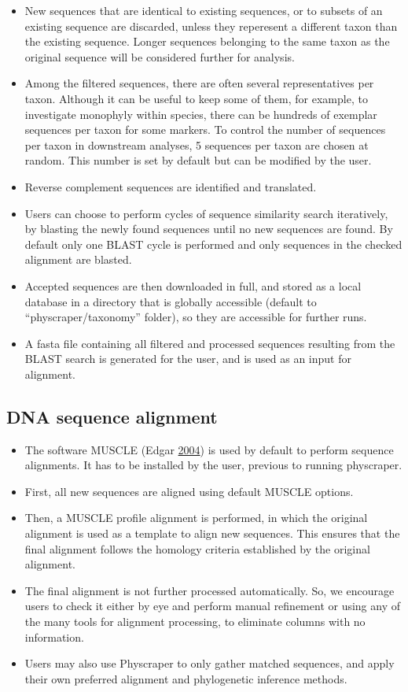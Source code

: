 \documentclass[]{article}
\providecommand{\tightlist}{%
  \setlength{\itemsep}{0pt}\setlength{\parskip}{0pt}}
\begin{document}
\begin{itemize}
\item
  New sequences that are identical to existing sequences, or to subsets of an existing sequence are discarded, unless they reperesent a different taxon than the existing sequence.
  Longer sequences belonging to the
  same taxon as the original sequence will be considered further for analysis.
\item
  Among the filtered sequences, there are often several representatives per taxon.
  Although it can be useful to keep some of them, for example, to investigate monophyly
  within species, there can be hundreds of exemplar sequences per taxon for some markers.
  To control the number of sequences per taxon in downstream analyses,
  5 sequences per taxon are chosen at random. This number is set by default but can be modified by the user.
\item
  Reverse complement sequences are identified and translated.
\item
  Users can choose to perform cycles of sequence similarity search iteratively, by blasting the newly found sequences until no new sequences are found. By default only one BLAST cycle is performed and only sequences in the checked alignment are blasted.
\item
  Accepted sequences are then downloaded in full, and stored as a local database in a directory that is globally accessible (default to ``physcraper/taxonomy'' folder), so they are accessible for further runs.
\item
  A fasta file containing all filtered and processed sequences resulting from the BLAST search is generated for the user, and is used as an input for alignment.
\end{itemize}

\hypertarget{dna-sequence-alignment}{%
\subsection{DNA sequence alignment}\label{dna-sequence-alignment}}

\begin{itemize}
\tightlist
\item
  The software MUSCLE (Edgar \protect\hyperlink{ref-edgar2004muscle}{2004}) is used by default to perform sequence alignments. It has to be installed by the user, previous to running physcraper.
\item
  First, all new sequences are aligned using default MUSCLE options.
\item
  Then, a MUSCLE profile alignment is performed, in which the original alignment
  is used as a template to align new sequences. This ensures that the final alignment
  follows the homology criteria established by the original alignment.
\item
  The final alignment is not further processed automatically. So, we encourage users
  to check it either by eye and perform manual refinement or using any of the many
  tools for alignment processing, to eliminate columns with no information.
\item
  Users may also use Physcraper to only gather matched sequences, and apply their own preferred alignment and phylogenetic inference methods.
\end{itemize}
\end{document}
